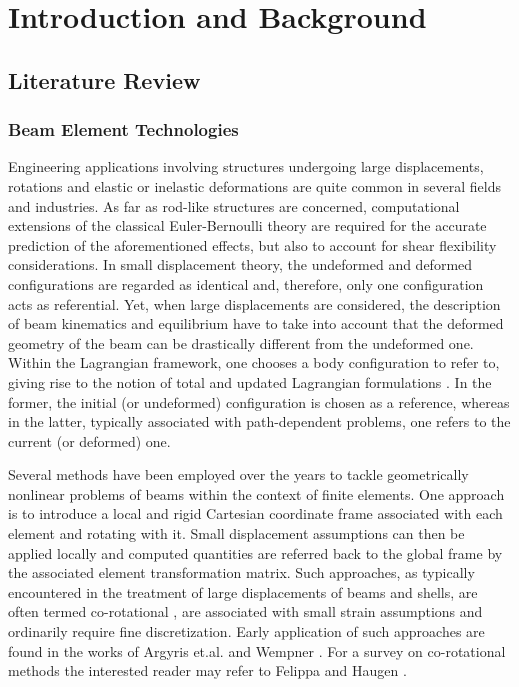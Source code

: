 \chapter{Introduction and Background}

\section{Literature Review}

\subsection{Beam Element Technologies}
Engineering applications involving structures undergoing large
displacements, rotations and elastic or inelastic deformations are quite
common in several fields and industries. As far as rod-like structures
are concerned, computational extensions of the classical Euler-Bernoulli theory
are required for the accurate prediction of the aforementioned effects, but
also to account for shear flexibility considerations.
In small displacement theory, the undeformed and deformed configurations are
regarded as identical and, therefore, only one configuration acts as
referential. Yet, when large displacements are considered, the
description of beam kinematics and equilibrium have to take into account that
the deformed geometry of the beam can be drastically different from the
undeformed one.  Within the Lagrangian framework, one chooses a body configuration
to refer to, giving rise to the notion of total and updated
Lagrangian formulations \cite{Bathe:1979}. In the former, the initial (or 
undeformed)
configuration is chosen as a reference, whereas in the latter, typically
associated with path-dependent problems, one refers to the current (or deformed)
one.

Several methods have been employed over the years to tackle geometrically
nonlinear problems of beams within the context of finite elements.  One approach
is to introduce a local and rigid Cartesian coordinate frame associated with
each element and rotating with it. Small displacement assumptions can then be
applied locally and computed quantities are referred back to the global
frame by the associated element transformation matrix. Such approaches, as
typically encountered in the treatment of large displacements of beams
and shells, are often termed co-rotational 
\cite{Belytschko:1973,Belytschko:1977,Rankin,Crisfield2},
are associated with small strain assumptions and ordinarily require fine
discretization. Early application of such approaches
are found in the works of Argyris et.al. \cite{Argyris} and Wempner 
\cite{Wempner:1969}. For
a survey on co-rotational methods the interested reader may refer to Felippa
and Haugen \cite{Felippa:2005}.

